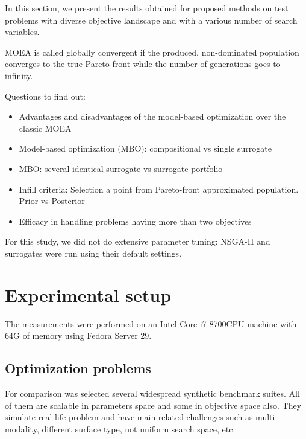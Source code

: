 In this section, we present the results obtained for proposed methods on test problems with diverse objective landscape and with a various number of search variables.

MOEA is called globally convergent if the produced, non-dominated population converges to the true Pareto front while the number of generations goes to infinity.

Questions to find out:
\begin{itemize}
    \item Advantages and disadvantages of the model-based optimization over the classic MOEA
    \item Model-based optimization (MBO): compositional vs single surrogate 
    \item MBO: several identical surrogate vs surrogate portfolio
    \item Infill criteria: Selection a point from Pareto-front approximated population. Prior vs Posterior
    \item Efficacy in handling problems having more than two objectives
\end{itemize}


For this study, we did not do extensive parameter tuning: NSGA-II and surrogates were run using their default settings.
\cite{kouwe2018benchmarking}

\section{Experimental setup}
The measurements were performed on an Intel Core i7-8700CPU machine with 64G of memory using Fedora Server 29.

\subsection{Optimization problems}
For comparison was selected several widespread synthetic benchmark suites. All of them are scalable in parameters space and some in objective space also. They simulate real life problem and have main related challenges such as multi-modality, different surface type, not uniform search space, etc.


